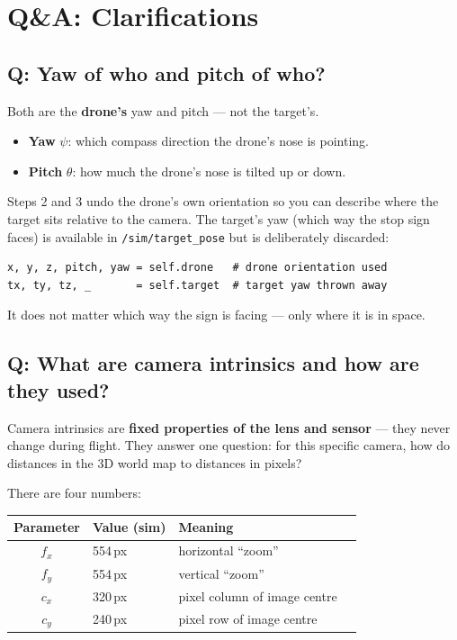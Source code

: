\documentclass[11pt]{article}
\begin{document}
\section{Q\&A: Clarifications}

\subsection*{Q: Yaw of who and pitch of who?}

Both are the \textbf{drone's} yaw and pitch --- not the target's.

\begin{itemize}
    \item \textbf{Yaw} $\psi$: which compass direction the drone's nose is pointing.
    \item \textbf{Pitch} $\theta$: how much the drone's nose is tilted up or down.
\end{itemize}

Steps 2 and 3 undo the drone's own orientation so you can describe where the
target sits relative to the camera. The target's yaw (which way the stop sign
faces) is available in \texttt{/sim/target\_pose} but is deliberately discarded:

\begin{verbatim}
x, y, z, pitch, yaw = self.drone   # drone orientation used
tx, ty, tz, _       = self.target  # target yaw thrown away
\end{verbatim}

It does not matter which way the sign is facing --- only where it is in space.

\subsection*{Q: What are camera intrinsics and how are they used?}

Camera intrinsics are \textbf{fixed properties of the lens and sensor} --- they
never change during flight. They answer one question: for this specific camera,
how do distances in the 3D world map to distances in pixels?

There are four numbers:

\begin{center}
\begin{tabular}{@{}clll@{}}
\toprule
Parameter & Value (sim) & Meaning \\
\midrule
$f_x$ & 554\,px & horizontal ``zoom'' \\
$f_y$ & 554\,px & vertical ``zoom'' \\
$c_x$ & 320\,px & pixel column of image centre \\
$c_y$ & 240\,px & pixel row of image centre \\
\bottomrule
\end{tabular}
\end{center}
\end{document}
